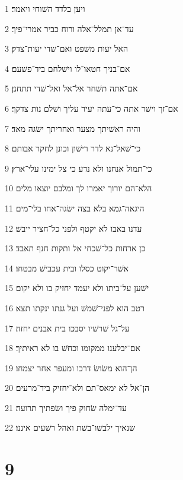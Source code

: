 \par 1 ויען בלדד השׁוחי ויאמר׃
\par 2 עד־אן תמלל־אלה ורוח כביר אמרי־פיך׃
\par 3 האל יעות משׁפט ואם־שׁדי יעות־צדק׃
\par 4 אם־בניך חטאו־לו וישׁלחם ביד־פשׁעם׃
\par 5 אם־אתה תשׁחר אל־אל ואל־שׁדי תתחנן׃
\par 6 אם־זך וישׁר אתה כי־עתה יעיר עליך ושׁלם נות צדקך׃
\par 7 והיה ראשׁיתך מצער ואחריתך ישׂגה מאד׃
\par 8 כי־שׁאל־נא לדר רישׁון וכונן לחקר אבותם׃
\par 9 כי־תמול אנחנו ולא נדע כי צל ימינו עלי־ארץ׃
\par 10 הלא־הם יורוך יאמרו לך ומלבם יוצאו מלים׃
\par 11 היגאה־גמא בלא בצה ישׂגה־אחו בלי־מים׃
\par 12 עדנו באבו לא יקטף ולפני כל־חציר ייבשׁ׃
\par 13 כן ארחות כל־שׁכחי אל ותקות חנף תאבד׃
\par 14 אשׁר־יקוט כסלו ובית עכבישׁ מבטחו׃
\par 15 ישׁען על־ביתו ולא יעמד יחזיק בו ולא יקום׃
\par 16 רטב הוא לפני־שׁמשׁ ועל גנתו ינקתו תצא׃
\par 17 על־גל שׁרשׁיו יסבכו בית אבנים יחזה׃
\par 18 אם־יבלענו ממקומו וכחשׁ בו לא ראיתיך׃
\par 19 הן־הוא משׂושׂ דרכו ומעפר אחר יצמחו׃
\par 20 הן־אל לא ימאס־תם ולא־יחזיק ביד־מרעים׃
\par 21 עד־ימלה שׂחוק פיך ושׂפתיך תרועה׃
\par 22 שׂנאיך ילבשׁו־בשׁת ואהל רשׁעים איננו׃

\chapter{9}

